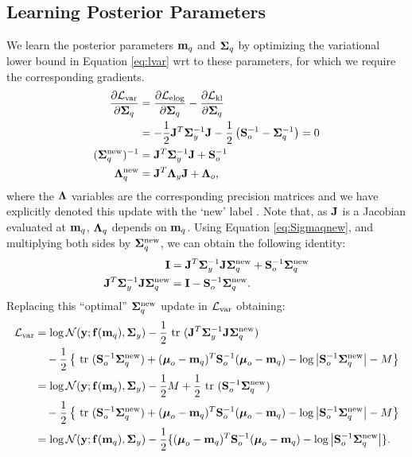 \subsection{Learning Posterior Parameters}
We learn the posterior parameters $\mathbf{m}_{q}$ and $\mathbf{\Sigma}_{q}$ by optimizing the variational lower bound in Equation \eqref{eq:lvar}
wrt to these parameters, for which we require the corresponding gradients.
%
\begin{align}
	\deriv{\lvar}{\Sigmaq} &= \deriv{\lelog}{\Sigmaq} - \deriv{\lkl}{\Sigmaq} \\
	&= - \frac{1}{2} \J^{T} \Sigmay^{-1} \J - \frac{1}{2} \left( \Sigmao^{-1} - \Sigmaq^{-1} \right) = 0 \\
	\label{eq:Sigmaqnew}
	(\Sigmaqnew)^{-1} &= \J^{T} \Sigmay^{-1} \J + \Sigmao^{-1} \\
	\label{eq:Lambdaqnew}
	\Lambdaqnew & = \J^{T} \Lambday \J + \Lambdao \text{,} 
\end{align}
where the $\mathbf{\Lambda}$ variables are the corresponding precision matrices and we have 
explicitly denoted this update with the `$\text{new}$' label . Note that, as $\mathbf{J}$ is a Jacobian evaluated 
at $\mathbf{m}_{q}$, $\mathbf{\Lambda}_{q}$ depends on $\mathbf{m}_{q}$. 
 Using Equation  \eqref{eq:Sigmaqnew}, and multiplying both sides by ${\mathbf{\Sigma}_{q}^{\text{new}}}$, we can obtain the following identity:
 \begin{align}
 		\mathbf{I} &= \mathbf{J}^{T} \mathbf{\Sigma}_{y}^{-1} \mathbf{J} {\mathbf{\Sigma}_{q}^{\text{new}}} + \mathbf{S}_{o}^{-1} {\mathbf{\Sigma}_{q}^{\text{new}}} \\
		\mathbf{J}^{T} \mathbf{\Sigma}_{y}^{-1} \mathbf{J} {\mathbf{\Sigma}_{q}^{\text{new}}}  &= \mathbf{I} - \mathbf{S}_{o}^{-1} {\mathbf{\Sigma}_{q}^{\text{new}}} \text{.}
 \end{align}
Replacing this ``optimal'' ${\mathbf{\Sigma}_{q}^{\text{new}}}$ update in $\mathcal{L}_{\text{var}}$ obtaining:
 \begin{align}
 	\lvar &=   \log \Normal(\vecy; \fmq, \Sigmay) - \frac{1}{2} \trace(\J^{T} \Sigmay^{-1} \J \Sigmaqnew )   \\
		 & \quad - \frac{1}{2}  
	\left\{ 
		\trace(\Sigmao^{-1} \Sigmaqnew) + (\muo - \mq)^{T} \Sigmao^{-1} (\muo - \mq) - \log \det{\Sigmao^{-1} \Sigmaqnew} - M
	\right\}\\
	&=  \log \Normal(\vecy; \fmq, \Sigmay)  - \frac{1}{2}M + \frac{1}{2} \trace(\Sigmao^{-1} \Sigmaqnew) \\
	& \quad - \frac{1}{2}  
	\left\{ 
		\trace(\Sigmao^{-1} \Sigmaqnew) + (\muo - \mq)^{T} \Sigmao^{-1} (\muo - \mq) - \log \det{\Sigmao^{-1} \Sigmaqnew} - M
	\right\}\\	
	&=
	\label{eq:lvarmean}
	\log \Normal(\vecy; \fmq, \Sigmay)  - 
	\frac{1}{2} \{ (\muo - \mq)^{T} \Sigmao^{-1} (\muo - \mq) - \log \det{\Sigmao^{-1} \Sigmaqnew} \}	\text{.}
 \end{align}
